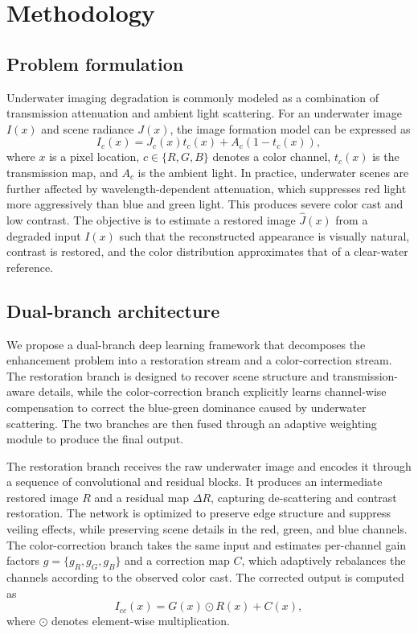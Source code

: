 \section{Methodology} \label{sec:methodology}

\subsection{Problem formulation}

Underwater imaging degradation is commonly modeled as a combination of transmission attenuation and ambient light scattering. For an underwater image $I(x)$ and scene radiance $J(x)$, the image formation model can be expressed as
\begin{equation}
I_c(x) = J_c(x) t_c(x) + A_c(1 - t_c(x)),
\label{eq:formation}
\end{equation}
where $x$ is a pixel location, $c \in \{R,G,B\}$ denotes a color channel, $t_c(x)$ is the transmission map, and $A_c$ is the ambient light. In practice, underwater scenes are further affected by wavelength-dependent attenuation, which suppresses red light more aggressively than blue and green light. This produces severe color cast and low contrast. The objective is to estimate a restored image $\hat{J}(x)$ from a degraded input $I(x)$ such that the reconstructed appearance is visually natural, contrast is restored, and the color distribution approximates that of a clear-water reference.

\subsection{Dual-branch architecture}

We propose a dual-branch deep learning framework that decomposes the enhancement problem into a restoration stream and a color-correction stream. The restoration branch is designed to recover scene structure and transmission-aware details, while the color-correction branch explicitly learns channel-wise compensation to correct the blue-green dominance caused by underwater scattering. The two branches are then fused through an adaptive weighting module to produce the final output.

The restoration branch receives the raw underwater image and encodes it through a sequence of convolutional and residual blocks. It produces an intermediate restored image $R$ and a residual map $\Delta R$, capturing de-scattering and contrast restoration. The network is optimized to preserve edge structure and suppress veiling effects, while preserving scene details in the red, green, and blue channels. The color-correction branch takes the same input and estimates per-channel gain factors $g = \{g_R, g_G, g_B\}$ and a correction map $C$, which adaptively rebalances the channels according to the observed color cast. The corrected output is computed as
\begin{equation}
I_{cc}(x) = G(x) \odot R(x) + C(x),
\label{eq:color-correction}
\end{equation}
where $\odot$ denotes element-wise multiplication.

